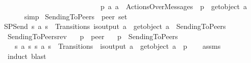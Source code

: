 \begin{isabellebody}
\ \ \ \ \ \ \ \ \ \ \ \ \ \ \ \ \ \ \ \ \ \ \ \ \ \ \ {\isachardoublequoteopen}{\isacharbraceleft}{\kern0pt}p{\isachardot}{\kern0pt}\ {\isasymexists}a{\isachardot}{\kern0pt}\ a\ {\isasymin}\ ActionsOverMessages\ {\isasymand}\ p\ {\isacharequal}{\kern0pt}\ get{\isacharunderscore}{\kern0pt}object\ a{\isacharbraceright}{\kern0pt}{\isachardoublequoteclose}{\isacharbrackright}{\kern0pt}\isanewline
\ \ \ \ \isamarkupfalse%
\ simp\isanewline
{}\isamarkupfalse%
%
\endisatagproof
{\isafoldproof}%
%
\isadelimproof
\isanewline
%
\endisadelimproof
\isanewline
{}\isamarkupfalse%
\ SendingToPeers\ {\isacharcolon}{\kern0pt}{\isacharcolon}{\kern0pt}\ {\isachardoublequoteopen}{\isacharprime}{\kern0pt}peer\ set{\isachardoublequoteclose}\ \isanewline
SPSend{\isacharcolon}{\kern0pt}\ {\isachardoublequoteopen}{\isasymlbrakk}{\isacharparenleft}{\kern0pt}s{}{\isacharcomma}{\kern0pt}\ a{\isacharcomma}{\kern0pt}\ s{}{\isacharparenright}{\kern0pt}\ {\isasymin}\ Transitions{\isacharsemicolon}{\kern0pt}\ is{\isacharunderscore}{\kern0pt}output\ a{\isasymrbrakk}\ {\isasymLongrightarrow}\ get{\isacharunderscore}{\kern0pt}object\ a\ {\isasymin}\ SendingToPeers{\isachardoublequoteclose}\isanewline
\isanewline
{}\isamarkupfalse%
\ SendingToPeers{\isacharunderscore}{\kern0pt}rev{\isacharcolon}{\kern0pt}\isanewline
\ \ \ p\ {\isacharcolon}{\kern0pt}{\isacharcolon}{\kern0pt}\ {\isachardoublequoteopen}{\isacharprime}{\kern0pt}peer{\isachardoublequoteclose}\isanewline
\ \ \ {\isachardoublequoteopen}p\ {\isasymin}\ SendingToPeers{\isachardoublequoteclose}\isanewline
\ \ \ {\isachardoublequoteopen}{\isasymexists}s{}\ a\ s{}{\isachardot}{\kern0pt}\ {\isacharparenleft}{\kern0pt}s{}{\isacharcomma}{\kern0pt}\ a{\isacharcomma}{\kern0pt}\ s{}{\isacharparenright}{\kern0pt}\ {\isasymin}\ Transitions\ {\isasymand}\ is{\isacharunderscore}{\kern0pt}output\ a\ {\isasymand}\ get{\isacharunderscore}{\kern0pt}object\ a\ {\isacharequal}{\kern0pt}\ p{\isachardoublequoteclose}\isanewline
%
\isadelimproof
\ \ %
\endisadelimproof
%
\isatagproof
{}\isamarkupfalse%
\ assms\isanewline
\ \ \isamarkupfalse%
\ {\isacharparenleft}{\kern0pt}induct{\isacharcomma}{\kern0pt}\ blast{\isacharparenright}{\kern0pt}%
\endisatagproof
{\isafoldproof}%
%
\isadelimproof
\isanewline
%
\endisadelimproof
\isanewline
{}\isamarkupfalse%

\end{isabellebody}
